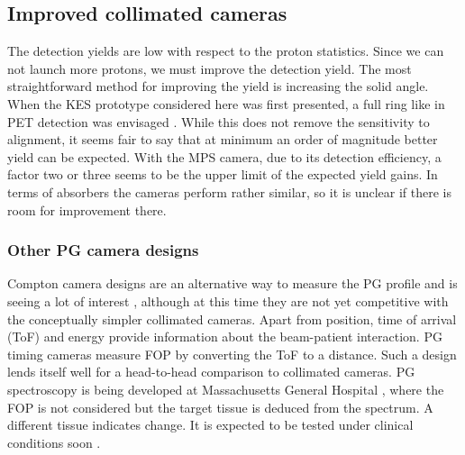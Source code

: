 \documentclass[a4paper,english]{article}
\begin{document}
\subsection{Improved collimated cameras}

The detection yields are low with respect to the proton statistics. Since we can not launch more protons, we must improve the detection yield. The most straightforward method for improving the yield is increasing the solid angle. When the KES prototype considered here was first presented, a full ring like in PET detection was envisaged \cite[figure 2]{Smeets2012}. While this does not remove the sensitivity to alignment, it seems fair to say that at minimum an order of magnitude better yield can be expected. With the MPS camera, due to its detection efficiency, a factor two or three seems to be the upper limit of the expected yield gains. In terms of absorbers the cameras perform rather similar, so it is unclear if there is room for improvement there.

\subsubsection{Other PG camera designs}

Compton camera designs are an alternative way to measure the PG profile and is seeing a lot of interest \citep{Nurdan2015,Krimmer2015,Hueso-Gonzalez2016}, although at this time they are not yet competitive with the conceptually simpler collimated cameras. Apart from position, time of arrival (ToF) and energy provide information about the beam-patient interaction. PG timing \citep{Golnik2014a} cameras measure FOP by converting the ToF to a distance. Such a design lends itself well for a head-to-head comparison to collimated cameras. PG spectroscopy is being developed at Massachusetts General Hospital \citep{Verburg2014}, where the FOP is not considered but the target tissue is deduced from the spectrum. A different tissue indicates change. It is expected to be tested under clinical conditions soon \citep{Verburg2016}.


\end{document}
